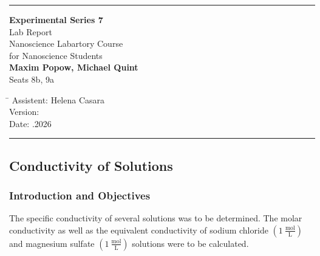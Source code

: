 \documentclass[
	a4paper,										%
	12pt,											%
	twoside,										%
	headsepline,								%
	footsepline,									%
	captions=tableheading,					%
]{scrartcl}
\begin{document}
	
	\begin{titlepage}
		\begin{center}
			\hrule													%
			\vspace*{5cm}
			\Huge {\textbf {Experimental Series 7}}\\						%
			\vspace*{0.5cm}
			\vspace*{1cm}
			\normalsize
			Lab Report	\\									
			Nanoscience Labartory Course \\ for Nanoscience Students\\
			\vspace*{0.5cm}
			\Large {\textbf{Maxim Popow, Michael Quint}}		\\						%
			\vspace*{0.5cm}
					\normalsize{Seats 8b, 9a}								%
			\vfill
		\end{center}
		\begin{tabbing}
			\hspace{3cm}\=\kill
			Assistent: \> Helena Casara \\						%
			Version:  \\									%
			Date: .2026 \\								%
		\end{tabbing}
		\hrule														%
\end{titlepage}

\setcounter{page}{1}
\setcounter{section}{7}								%
\setcounter{subsection}{0}							%
\setcounter{secnumdepth}{4}
	
\subsection{Conductivity of Solutions}

\subsubsection{Introduction and Objectives}

The specific conductivity of several solutions was to be determined.
The molar conductivity as well as the equivalent conductivity of sodium chloride $(1\ \mathrm{\frac{mol}{L}})$ and magnesium sulfate $(1\ \mathrm{\frac{mol}{L}})$ solutions
were to be calculated.
\end{document}
